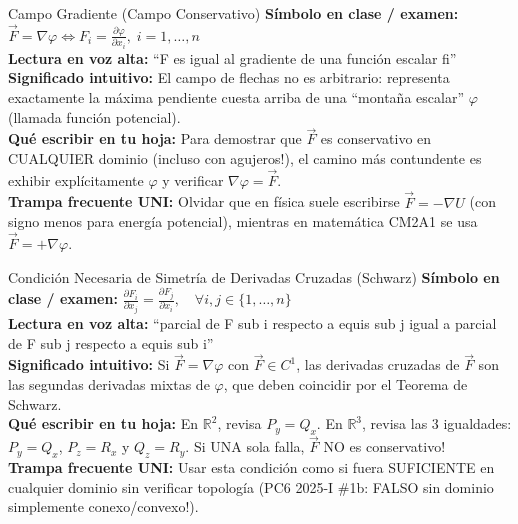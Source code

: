 \documentclass[11pt,a4paper]{article}
\begin{document}
\begin{definicionbox}{Campo Gradiente (Campo Conservativo)}
\textbf{Símbolo en clase / examen:} $\vec{F} = \nabla \varphi \iff F_i = \frac{\partial \varphi}{\partial x_i},\; i = 1,\dots,n$\\[0.15cm]
\textbf{Lectura en voz alta:} ``F es igual al gradiente de una función escalar fi''\\[0.12cm]
\textbf{Significado intuitivo:} El campo de flechas no es arbitrario: representa exactamente la máxima pendiente cuesta arriba de una ``montaña escalar'' $\varphi$ (llamada función potencial).\\[0.12cm]
\textbf{Qué escribir en tu hoja:} Para demostrar que $\vec{F}$ es conservativo en CUALQUIER dominio (incluso con agujeros!), el camino más contundente es exhibir explícitamente $\varphi$ y verificar $\nabla\varphi = \vec{F}$.\\[0.12cm]
\textbf{Trampa frecuente UNI:} Olvidar que en física suele escribirse $\vec{F} = -\nabla U$ (con signo menos para energía potencial), mientras en matemática CM2A1 se usa $\vec{F} = +\nabla\varphi$.
\end{definicionbox}

\begin{definicionbox}{Condición Necesaria de Simetría de Derivadas Cruzadas (Schwarz)}
\textbf{Símbolo en clase / examen:} $\frac{\partial F_i}{\partial x_j} = \frac{\partial F_j}{\partial x_i}, \quad \forall i, j \in \{1,\dots,n\}$\\[0.15cm]
\textbf{Lectura en voz alta:} ``parcial de F sub i respecto a equis sub j igual a parcial de F sub j respecto a equis sub i''\\[0.12cm]
\textbf{Significado intuitivo:} Si $\vec{F} = \nabla\varphi$ con $\vec{F} \in C^1$, las derivadas cruzadas de $\vec{F}$ son las segundas derivadas mixtas de $\varphi$, que deben coincidir por el Teorema de Schwarz.\\[0.12cm]
\textbf{Qué escribir en tu hoja:} En $\mathbb{R}^2$, revisa $P_y = Q_x$. En $\mathbb{R}^3$, revisa las 3 igualdades: $P_y = Q_x$, $P_z = R_x$ y $Q_z = R_y$. Si UNA sola falla, $\vec{F}$ NO es conservativo!\\[0.12cm]
\textbf{Trampa frecuente UNI:} Usar esta condición como si fuera SUFICIENTE en cualquier dominio sin verificar topología (PC6 2025-I \#1b: FALSO sin dominio simplemente conexo/convexo!).
\end{definicionbox}
\end{document}

